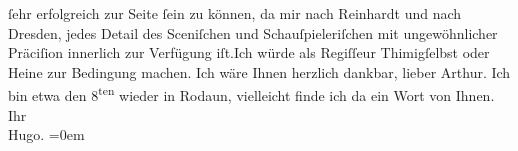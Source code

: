 \begin{ledgroupsized}[t]{13cm}
               ſehr erfolgreich zur Seite ſein zu können, da mir nach Reinhardt und nach Dresden, jedes Detail
               des Sceniſchen und Schauſpieleriſchen mit ungewöhnlicher Präciſion innerlich zur
               Verfügung iſt.\hspace*{1.5em}Ich würde als Regiſſeur Thimigſelbst oder Heine zur Bedingung machen.\pend
           \pstart
           Ich wäre Ihnen herzlich dankbar, lieber Arthur. Ich bin etwa den 8\textsuperscript{ten} wieder in Rodaun, vielleicht finde ich da
               ein Wort von Ihnen.\pend
           \pstart
           Ihr{\\[\baselineskip]}\spacefill\mbox{Hugo.}\pend
           \leftskip=0em{}\endnumbering{}\end{ledgroupsized}  \newcommand{\dateiname}{L02112}\newcommand{\titel}{Hugo von Hofmannsthal an Arthur Schnitzler, 3. 1. 1913}\newcommand{\editorInnen}{Martin Anton Müller und Gerd-Hermann Susen}
      